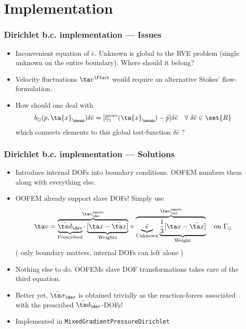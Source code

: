 \documentclass[11pt]{beamer} %
\newcommand{\pore}{\mathrm{pore}}
\begin{document}
\section{Implementation}
\begin{frame}
 \frametitle{Dirichlet b.c. implementation --- Issues}
 \begin{itemize}
  \item Inconvenient equation of $\bar{e}$. Unknown is global to the RVE problem (single unknown on the entire boundary). Where should it belong?
  \item Velocity fluctuations $\ta v^\fluct$ would require an alternative Stokes' flow-formulation.
  \item How should one deal with 
\begin{equation*}
    b_\Box(p,\ta{x}_\mean)\delta\bar{e}
     =
    [l_\Box^\pore(\ta{x}_\mean) - \bar{p}]\delta\bar{e}
    \quad \forall\; \delta\bar{e} \in \set{R}
\end{equation*}
  which connects elements to this global test-function $\delta\bar{e}$ ? 
 \end{itemize}
\end{frame}
\begin{frame}
\frametitle{Dirichlet b.c. implementation --- Solutions}
\begin{itemize}
  \item Introduce internal DOFs into boundary conditions. OOFEM numbers them along with everything else.
  \item OOFEM already support slave DOFs! Simply use 
  \begin{equation*}
   \ta v = \overbrace{\underbrace{\bar{\ts d}_\dev}_{\text{Prescribed}} \cdot \underbrace{[\ta x - \bar{\ta x}]}_{\text{Weights}}}^{\ta v^\macro_\dev} + 
           \overbrace{\underbrace{\bar{e}}_{\text{Unknown}} \underbrace{\frac13 [\ta x - \bar{\ta x}]}_{\text{Weight}}}^{\ta v^\macro_\vol}  \quad\text{on } \Gamma_\Box
  \end{equation*}
  ( only boundary matters, internal DOFs can left alone )
  \item Nothing else to do. OOFEMs slave DOF transformations takes care of the third equation.
  \item Better yet, $\bar{\ts\sigma}_\dev$ is obtained trivially as the reaction-forces associated with the prescribed $\bar{\ts d}_\dev$-DOFs!
  \item Implemented in \texttt{MixedGradientPressureDirichlet}
 \end{itemize}
\end{frame}
\end{document}
